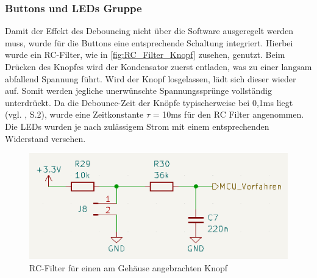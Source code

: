 \subsubsection{Buttons und LEDs Gruppe}
Damit der Effekt des Debouncing nicht über die Software ausgeregelt werden muss, wurde für die Buttons eine entsprechende Schaltung integriert. Hierbei wurde ein RC-Filter, wie in \autoref{fig:RC_Filter_Knopf} zusehen, genutzt. Beim Drücken des Knopfes wird der Kondensator zuerst entladen, was zu einer langsam abfallend Spannung führt. Wird der Knopf losgelassen, lädt sich dieser wieder auf. Somit werden jegliche unerwünschte Spannungssprünge vollständig unterdrückt. Da die Debounce-Zeit der Knöpfe typischerweise bei 0,1ms liegt (vgl. \cite{Schurter_Knopf}, S.2), wurde eine Zeitkonstante $\tau$ = 10ms für den RC Filter angenommen. Die \ac{LED}s wurden je nach zulässigem Strom mit einem entsprechenden Widerstand versehen.
\begin{figure}[H]
	\centering
	\includegraphics[width=1.0\textwidth]{images/Hardware/RC_Filter_Knopf.PNG}
	\caption{RC-Filter für einen am Gehäuse angebrachten Knopf}
	\label{fig:RC_Filter_Knopf}
\end{figure}
